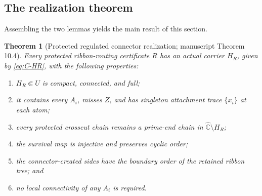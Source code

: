 \documentclass[11pt,reqno]{amsart}
\newtheorem{theorem}{Theorem}[section]
\theoremstyle{definition}
\theoremstyle{remark}
\newcommand{\Chat}{\widehat{\mathbb C}}
\begin{document}
\subsection*{The realization theorem}
Assembling the two lemmas yields the main result of this section.

\begin{theorem}[Protected regulated connector realization; manuscript
Theorem 10.4]\label{thm:realization}
Every protected ribbon-routing certificate $R$ has an actual carrier
$H_R$, given by \eqref{eq:C-HR}, with the following properties:
\begin{enumerate}
\item $H_R\Subset U$ is compact, connected, and full;
\item it contains every $A_i$, misses $Z$, and has singleton attachment
trace $\{x_i\}$ at each atom;
\item every protected crosscut chain remains a prime-end chain in
$\Chat\setminus H_R$;
\item the survival map is injective and preserves cyclic order;
\item the connector-created sides have the boundary order of the retained
ribbon tree; and
\item no local connectivity of any $A_i$ is required.
\end{enumerate}
\end{theorem}
\end{document}
